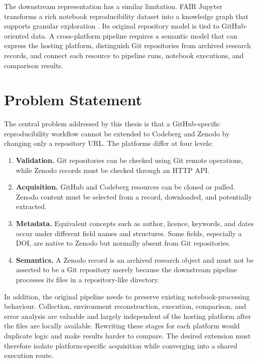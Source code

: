 The downstream representation has a similar limitation. FAIR Jupyter transforms a rich notebook reproducibility dataset into a knowledge graph that supports granular exploration \cite{samuel2024fairjupyter}. Its original repository model is tied to GitHub-oriented data. A cross-platform pipeline requires a semantic model that can express the hosting platform, distinguish Git repositories from archived research records, and connect each resource to pipeline runs, notebook executions, and comparison results.

\section{Problem Statement}

The central problem addressed by this thesis is that a GitHub-specific reproducibility workflow cannot be extended to Codeberg and Zenodo by changing only a repository URL. The platforms differ at four levels:

\begin{enumerate}[label=\arabic*.]
  \item \textbf{Validation.} Git repositories can be checked using Git remote operations, while Zenodo records must be checked through an HTTP API.
  \item \textbf{Acquisition.} GitHub and Codeberg resources can be cloned or pulled. Zenodo content must be selected from a record, downloaded, and potentially extracted.
  \item \textbf{Metadata.} Equivalent concepts such as author, licence, keywords, and dates occur under different field names and structures. Some fields, especially a DOI, are native to Zenodo but normally absent from Git repositories.
  \item \textbf{Semantics.} A Zenodo record is an archived research object and must not be asserted to be a Git repository merely because the downstream pipeline processes its files in a repository-like directory.
\end{enumerate}

In addition, the original pipeline needs to preserve existing notebook-processing behaviour. Collection, environment reconstruction, execution, comparison, and error analysis are valuable and largely independent of the hosting platform after the files are locally available. Rewriting these stages for each platform would duplicate logic and make results harder to compare. The desired extension must therefore isolate platform-specific acquisition while converging into a shared execution route.

